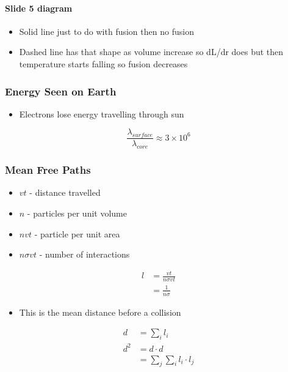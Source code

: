 \documentclass[a4paper,11pt,normalem]{article}
\begin{document}
\paragraph{Slide 5 diagram}\label{slide-5-diagram}

\begin{itemize}
\item
  Solid line just to do with fusion then no fusion
\item
  Dashed line has that shape as volume increase so dL/dr does but then
  temperature starts falling so fusion decreases
\end{itemize}

\subsubsection{Energy Seen on Earth}\label{energy-seen-on-earth}

\begin{itemize}
\item
  Electrons lose energy travelling through sun
\end{itemize}

\[
    \frac{\lambda_{surface}}{\lambda_{core}} \approx 3\times10^6
\]

\subsubsection{Mean Free Paths}\label{mean-free-paths}

\begin{itemize}
\item
  \(vt\) - distance travelled
\item
  \(n\) - particles per unit volume
\item
  \(nvt\) - particle per unit area
\item
  \(n\sigma vt\) - number of interactions
\end{itemize}

\[
    \begin{aligned}
    l &= \frac{vt}{n\sigma vt} \\
    &= \frac{1}{n\sigma}
    \end{aligned}
\]

\begin{itemize}
\item
  This is the mean distance before a collision
\end{itemize}

\[
    \begin{aligned}
    d &= \sum_i l_i \\
    d^2 &= d \cdot d \\
    &= \sum_j \sum_i l_i \cdot l_j
    \end{aligned}
\]
\end{document}
